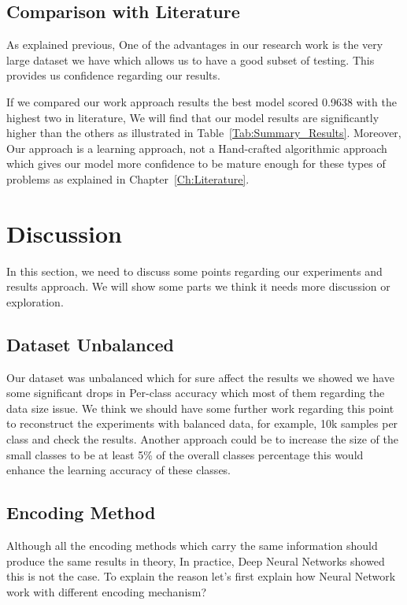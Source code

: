 \subsection{Comparison with Literature}
As explained previous, One of the advantages in our research work is the very large dataset we have which allows us to have a good subset of testing. This provides us confidence regarding our results.

If we compared our work approach results the best model scored 0.9638 with the highest two in literature, We will find that our model results are significantly higher than the others as illustrated in Table~\ref{Tab:Summary_Results}. Moreover, Our approach is a learning approach, not a Hand-crafted algorithmic approach which gives our model more confidence to be mature enough for these types of problems as explained in Chapter~\ref{Ch:Literature}.

\clearpage

\section{Discussion}\label{Sec:Discussion}

In this section, we need to discuss some points regarding our experiments and results approach. We will show some parts we think it needs more discussion or exploration.


\subsection{Dataset Unbalanced}

Our dataset was unbalanced which for sure affect the results we showed we have some significant drops in Per-class accuracy which most of them regarding the data size issue. We think we should have some further work regarding this point to reconstruct the experiments with balanced data, for example, 10k samples per class and check the results. Another approach could be to increase the size of the small classes to be at least 5\% of the overall classes percentage this would enhance the learning accuracy of these classes.  
\subsection{Encoding Method}

Although all the encoding methods which carry the same information should produce the same results in theory, In practice, Deep Neural Networks showed this is not the case. To explain the reason let’s first explain how Neural Network work with different encoding mechanism?


